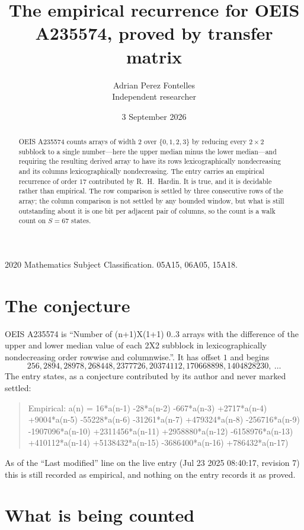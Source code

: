 \documentclass[11pt,a4paper]{article}
\title{The empirical recurrence for OEIS A235574, proved by transfer matrix}
\author{Adrian Perez Fontelles\\ \small Independent researcher}
\date{3 September 2026}
\theoremstyle{plain}
\theoremstyle{definition}
\begin{document}
\maketitle

\begin{abstract}
OEIS A235574 counts arrays of width $2$ over $\{0,1,2,3\}$ by reducing every $2\times2$ subblock to a
single number---here the upper median minus the lower median---and requiring the resulting derived array to have its rows
lexicographically nondecreasing and its columns lexicographically nondecreasing. The entry carries an
empirical recurrence of order $17$ contributed by R.~H.~Hardin. It is true, and it is
decidable rather than empirical. The row comparison is settled by three consecutive rows of the
array; the column comparison is not settled by any bounded window, but what is still outstanding
about it is one bit per adjacent pair of columns, so the count is a walk count on $S=67$
states.
\end{abstract}

\noindent\small 2020 Mathematics Subject Classification. 05A15, 06A05, 15A18.\normalsize

\section{The conjecture}

OEIS A235574 is ``Number of (n+1)X(1+1) 0..3 arrays with the difference of the upper and lower median value of each 2X2 subblock in lexicographically nondecreasing order rowwise and columnwise.''. It has offset $1$ and begins
\[
256, 2894, 28978, 268448, 2377726, 20374112, 170668898, 1404828230,\ \dots
\]
The entry states, as a conjecture contributed by its author and never marked settled:
\begin{quote}
Empirical: a(n) = 16*a(n-1) -28*a(n-2) -667*a(n-3) +2717*a(n-4) +9004*a(n-5) -55228*a(n-6) -31261*a(n-7) +479324*a(n-8) -256716*a(n-9) -1907096*a(n-10) +2311456*a(n-11) +2958880*a(n-12) -6158976*a(n-13) +410112*a(n-14) +5138432*a(n-15) -3686400*a(n-16) +786432*a(n-17)
\end{quote}
As of the ``Last modified'' line on the live entry (Jul 23 2025 08:40:17, revision 7) this is still
recorded as empirical, and nothing on the entry records it as proved.

\section{What is being counted}
\end{document}
